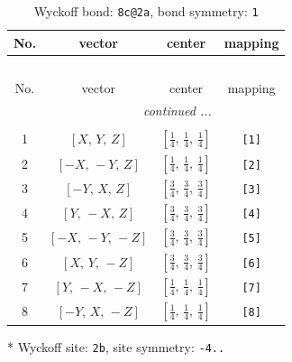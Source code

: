 \documentclass[fleqn,8pt]{jsarticle}
\begin{document}
\renewcommand{\arraystretch}{1.2}
\begin{longtable}{cccc}
\caption{Wyckoff bond: {\tt 8c@2a}, bond symmetry: {\tt 1}}
 \\
 \hline \hline
No. & vector & center & mapping \\ \hline \endfirsthead

\multicolumn{3}{l}{\tablename\ \thetable{}} \\
 \hline \hline
No. & vector & center & mapping \\ \hline \endhead

 \hline \hline
\multicolumn{3}{r}{\footnotesize\it continued ...} \\ \endfoot

 \hline \hline
\multicolumn{3}{r}{} \\ \endlastfoot

1 & $\left[ X,\, Y,\, Z \right]$ & $\left[ \frac{1}{4},\, \frac{1}{4},\, \frac{1}{4} \right]$ & {\tt [1]} \\ \hline
2 & $\left[ - X,\, - Y,\, Z \right]$ & $\left[ \frac{1}{4},\, \frac{1}{4},\, \frac{1}{4} \right]$ & {\tt [2]} \\ \hline
3 & $\left[ - Y,\, X,\, Z \right]$ & $\left[ \frac{3}{4},\, \frac{3}{4},\, \frac{3}{4} \right]$ & {\tt [3]} \\ \hline
4 & $\left[ Y,\, - X,\, Z \right]$ & $\left[ \frac{3}{4},\, \frac{3}{4},\, \frac{3}{4} \right]$ & {\tt [4]} \\ \hline
5 & $\left[ - X,\, - Y,\, - Z \right]$ & $\left[ \frac{3}{4},\, \frac{3}{4},\, \frac{3}{4} \right]$ & {\tt [5]} \\ \hline
6 & $\left[ X,\, Y,\, - Z \right]$ & $\left[ \frac{3}{4},\, \frac{3}{4},\, \frac{3}{4} \right]$ & {\tt [6]} \\ \hline
7 & $\left[ Y,\, - X,\, - Z \right]$ & $\left[ \frac{1}{4},\, \frac{1}{4},\, \frac{1}{4} \right]$ & {\tt [7]} \\ \hline
8 & $\left[ - Y,\, X,\, - Z \right]$ & $\left[ \frac{1}{4},\, \frac{1}{4},\, \frac{1}{4} \right]$ & {\tt [8]} \\
\end{longtable}
* Wyckoff site: {\tt 2b}, site symmetry: {\tt -4..}
\renewcommand{\arraystretch}{1.2}
\end{document}
